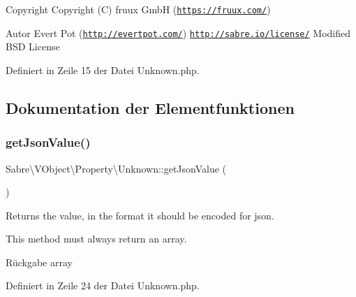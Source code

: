 \begin{DoxyCopyright}{Copyright}
Copyright (C) fruux GmbH (\href{https://fruux.com/}{\tt https\+://fruux.\+com/}) 
\end{DoxyCopyright}
\begin{DoxyAuthor}{Autor}
Evert Pot (\href{http://evertpot.com/}{\tt http\+://evertpot.\+com/})  \href{http://sabre.io/license/}{\tt http\+://sabre.\+io/license/} Modified B\+SD License 
\end{DoxyAuthor}


Definiert in Zeile 15 der Datei Unknown.\+php.



\subsection{Dokumentation der Elementfunktionen}
\mbox{\label{class_sabre_1_1_v_object_1_1_property_1_1_unknown_af9edb530dc69b930265a328180de39f3}} 
\subsubsection{\texorpdfstring{get\+Json\+Value()}{getJsonValue()}}
{\footnotesize\ttfamily Sabre\textbackslash{}\+V\+Object\textbackslash{}\+Property\textbackslash{}\+Unknown\+::get\+Json\+Value (\begin{DoxyParamCaption}{ }\end{DoxyParamCaption})}

Returns the value, in the format it should be encoded for json.

This method must always return an array.

\begin{DoxyReturn}{Rückgabe}
array 
\end{DoxyReturn}


Definiert in Zeile 24 der Datei Unknown.\+php.

\mbox{\label{class_sabre_1_1_v_object_1_1_property_1_1_unknown_a3468d4ec421906fd479b22699a0da16e}} 
